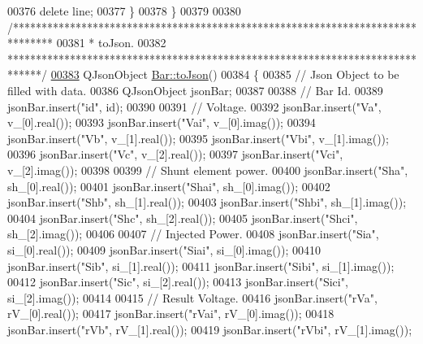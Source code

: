 \begin{DoxyCode}
00376     \textcolor{keyword}{delete} line;
00377   \}
00378 \}
00379 
00380 \textcolor{comment}{/*******************************************************************************}
00381 \textcolor{comment}{ * toJson.}
00382 \textcolor{comment}{ ******************************************************************************/}
\hypertarget{bar_8cpp_source_l00383}{}\hyperlink{group___models_ga3eb84c42b687db6cd98e11b8bd38c86e}{00383} QJsonObject \hyperlink{group___models_ga3eb84c42b687db6cd98e11b8bd38c86e}{Bar::toJson}()
00384 \{
00385   \textcolor{comment}{// Json Object to be filled with data.}
00386   QJsonObject jsonBar;
00387 
00388   \textcolor{comment}{// Bar Id.}
00389   jsonBar.insert(\textcolor{stringliteral}{"id"}, \textcolor{keywordtype}{id});
00390 
00391   \textcolor{comment}{// Voltage.}
00392   jsonBar.insert(\textcolor{stringliteral}{"Va"}, v\_[0].real());
00393   jsonBar.insert(\textcolor{stringliteral}{"Vai"}, v\_[0].imag());
00394   jsonBar.insert(\textcolor{stringliteral}{"Vb"}, v\_[1].real());
00395   jsonBar.insert(\textcolor{stringliteral}{"Vbi"}, v\_[1].imag());
00396   jsonBar.insert(\textcolor{stringliteral}{"Vc"}, v\_[2].real());
00397   jsonBar.insert(\textcolor{stringliteral}{"Vci"}, v\_[2].imag());
00398 
00399   \textcolor{comment}{// Shunt element power.}
00400   jsonBar.insert(\textcolor{stringliteral}{"Sha"}, sh\_[0].real());
00401   jsonBar.insert(\textcolor{stringliteral}{"Shai"}, sh\_[0].imag());
00402   jsonBar.insert(\textcolor{stringliteral}{"Shb"}, sh\_[1].real());
00403   jsonBar.insert(\textcolor{stringliteral}{"Shbi"}, sh\_[1].imag());
00404   jsonBar.insert(\textcolor{stringliteral}{"Shc"}, sh\_[2].real());
00405   jsonBar.insert(\textcolor{stringliteral}{"Shci"}, sh\_[2].imag());
00406 
00407   \textcolor{comment}{// Injected Power.}
00408   jsonBar.insert(\textcolor{stringliteral}{"Sia"}, si\_[0].real());
00409   jsonBar.insert(\textcolor{stringliteral}{"Siai"}, si\_[0].imag());
00410   jsonBar.insert(\textcolor{stringliteral}{"Sib"}, si\_[1].real());
00411   jsonBar.insert(\textcolor{stringliteral}{"Sibi"}, si\_[1].imag());
00412   jsonBar.insert(\textcolor{stringliteral}{"Sic"}, si\_[2].real());
00413   jsonBar.insert(\textcolor{stringliteral}{"Sici"}, si\_[2].imag());
00414 
00415   \textcolor{comment}{// Result Voltage.}
00416   jsonBar.insert(\textcolor{stringliteral}{"rVa"}, rV\_[0].real());
00417   jsonBar.insert(\textcolor{stringliteral}{"rVai"}, rV\_[0].imag());
00418   jsonBar.insert(\textcolor{stringliteral}{"rVb"}, rV\_[1].real());
00419   jsonBar.insert(\textcolor{stringliteral}{"rVbi"}, rV\_[1].imag());

\end{DoxyCode}
